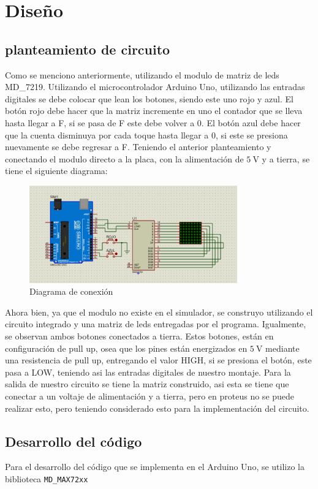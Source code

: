 \section{Diseño}

\subsection{planteamiento de circuito}
Como se menciono anteriormente, utilizando el modulo de matriz de leds MD\_7219.
Utilizando el microcontrolador Arduino Uno, utilizando las entradas digitales se debe 
colocar que lean los botones, siendo este uno rojo y azul. El botón rojo debe hacer que la matriz 
incremente en uno el contador que se lleva hasta llegar a F, si se pasa de F este debe volver a 0. El botón
azul debe hacer que la cuenta disminuya por cada toque hasta llegar a 0, si este se presiona nuevamente se debe
regresar a F. Teniendo el anterior planteamiento y conectando el modulo directo a la placa, con la alimentación
de $\SI{5}{\volt}$ y a tierra, se tiene el siguiente diagrama:
\begin{figure}[h!]
    \centering
    \includegraphics[width=0.8\textwidth]{Diagramas/Diagrama.png}
    \caption{Diagrama de conexión}
    \label{fig:conexion}
\end{figure}

Ahora bien, ya que el modulo no existe en el simulador, se construyo utilizando el circuito integrado y una matriz de leds
entregadas por el programa. Igualmente, se observan ambos botones conectados a tierra. Estos botones, están en configuración
de pull up, osea que los pines están energizados en $\SI{5}{\volt}$ mediante una resistencia de pull up, entregando el valor HIGH,
si se presiona el botón, este pasa a LOW, teniendo asi las entradas digitales de nuestro montaje. Para la salida de nuestro circuito 
se tiene la matriz construido, asi esta se tiene que conectar a un voltaje de alimentación y a tierra, pero en proteus no se puede realizar esto, 
pero teniendo considerado esto para la implementación del circuito.

\subsection{Desarrollo del código}
Para el desarrollo del código que se implementa en el Arduino Uno, se utilizo la biblioteca \texttt{MD\_MAX72xx}